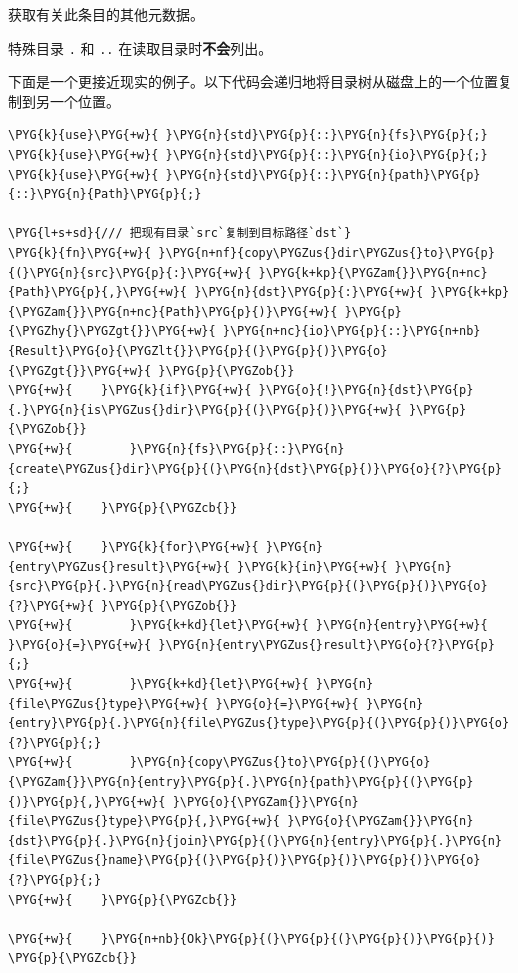 获取有关此条目的其他元数据。

特殊目录 \texttt{.} 和 \texttt{..} 在读取目录时\textbf{不会}列出。

下面是一个更接近现实的例子。以下代码会递归地将目录树从磁盘上的一个位置复制到另一个位置。

\begin{Verbatim}[commandchars=\\\{\},breaklines=true,breakanywhere=true,fontsize=\codefont,xleftmargin=17bp]
\PYG{k}{use}\PYG{+w}{ }\PYG{n}{std}\PYG{p}{::}\PYG{n}{fs}\PYG{p}{;}
\PYG{k}{use}\PYG{+w}{ }\PYG{n}{std}\PYG{p}{::}\PYG{n}{io}\PYG{p}{;}
\PYG{k}{use}\PYG{+w}{ }\PYG{n}{std}\PYG{p}{::}\PYG{n}{path}\PYG{p}{::}\PYG{n}{Path}\PYG{p}{;}

\PYG{l+s+sd}{/// 把现有目录`src`复制到目标路径`dst`}
\PYG{k}{fn}\PYG{+w}{ }\PYG{n+nf}{copy\PYGZus{}dir\PYGZus{}to}\PYG{p}{(}\PYG{n}{src}\PYG{p}{:}\PYG{+w}{ }\PYG{k+kp}{\PYGZam{}}\PYG{n+nc}{Path}\PYG{p}{,}\PYG{+w}{ }\PYG{n}{dst}\PYG{p}{:}\PYG{+w}{ }\PYG{k+kp}{\PYGZam{}}\PYG{n+nc}{Path}\PYG{p}{)}\PYG{+w}{ }\PYG{p}{\PYGZhy{}\PYGZgt{}}\PYG{+w}{ }\PYG{n+nc}{io}\PYG{p}{::}\PYG{n+nb}{Result}\PYG{o}{\PYGZlt{}}\PYG{p}{(}\PYG{p}{)}\PYG{o}{\PYGZgt{}}\PYG{+w}{ }\PYG{p}{\PYGZob{}}
\PYG{+w}{    }\PYG{k}{if}\PYG{+w}{ }\PYG{o}{!}\PYG{n}{dst}\PYG{p}{.}\PYG{n}{is\PYGZus{}dir}\PYG{p}{(}\PYG{p}{)}\PYG{+w}{ }\PYG{p}{\PYGZob{}}
\PYG{+w}{        }\PYG{n}{fs}\PYG{p}{::}\PYG{n}{create\PYGZus{}dir}\PYG{p}{(}\PYG{n}{dst}\PYG{p}{)}\PYG{o}{?}\PYG{p}{;}
\PYG{+w}{    }\PYG{p}{\PYGZcb{}}

\PYG{+w}{    }\PYG{k}{for}\PYG{+w}{ }\PYG{n}{entry\PYGZus{}result}\PYG{+w}{ }\PYG{k}{in}\PYG{+w}{ }\PYG{n}{src}\PYG{p}{.}\PYG{n}{read\PYGZus{}dir}\PYG{p}{(}\PYG{p}{)}\PYG{o}{?}\PYG{+w}{ }\PYG{p}{\PYGZob{}}
\PYG{+w}{        }\PYG{k+kd}{let}\PYG{+w}{ }\PYG{n}{entry}\PYG{+w}{ }\PYG{o}{=}\PYG{+w}{ }\PYG{n}{entry\PYGZus{}result}\PYG{o}{?}\PYG{p}{;}
\PYG{+w}{        }\PYG{k+kd}{let}\PYG{+w}{ }\PYG{n}{file\PYGZus{}type}\PYG{+w}{ }\PYG{o}{=}\PYG{+w}{ }\PYG{n}{entry}\PYG{p}{.}\PYG{n}{file\PYGZus{}type}\PYG{p}{(}\PYG{p}{)}\PYG{o}{?}\PYG{p}{;}
\PYG{+w}{        }\PYG{n}{copy\PYGZus{}to}\PYG{p}{(}\PYG{o}{\PYGZam{}}\PYG{n}{entry}\PYG{p}{.}\PYG{n}{path}\PYG{p}{(}\PYG{p}{)}\PYG{p}{,}\PYG{+w}{ }\PYG{o}{\PYGZam{}}\PYG{n}{file\PYGZus{}type}\PYG{p}{,}\PYG{+w}{ }\PYG{o}{\PYGZam{}}\PYG{n}{dst}\PYG{p}{.}\PYG{n}{join}\PYG{p}{(}\PYG{n}{entry}\PYG{p}{.}\PYG{n}{file\PYGZus{}name}\PYG{p}{(}\PYG{p}{)}\PYG{p}{)}\PYG{p}{)}\PYG{o}{?}\PYG{p}{;}
\PYG{+w}{    }\PYG{p}{\PYGZcb{}}

\PYG{+w}{    }\PYG{n+nb}{Ok}\PYG{p}{(}\PYG{p}{(}\PYG{p}{)}\PYG{p}{)}
\PYG{p}{\PYGZcb{}}
\end{Verbatim}

